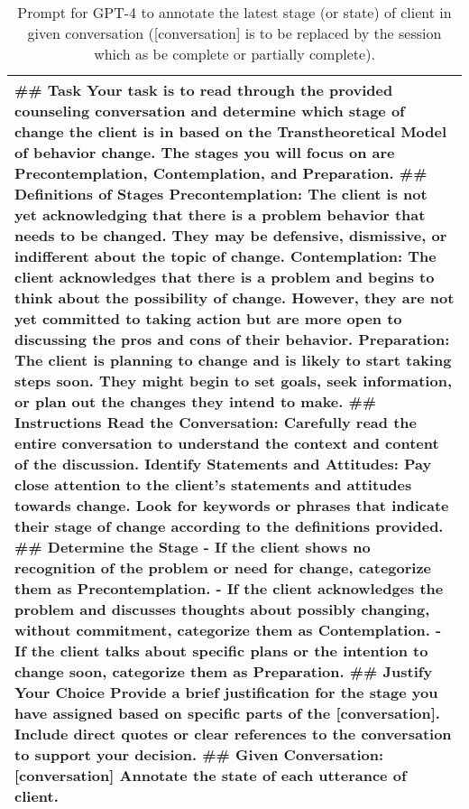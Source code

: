 \begin{table*}[tb]
\begin{tabularx}{\textwidth}{X}
\toprule
\#\# Task
Your task is to read through the provided counseling conversation and determine which stage of change the client is in based on the Transtheoretical Model of behavior change. The stages you will focus on are Precontemplation, Contemplation, and Preparation. \newline \#\# Definitions of Stages \newline Precontemplation: The client is not yet acknowledging that there is a problem behavior that needs to be changed. They may be defensive, dismissive, or indifferent about the topic of change. \newline Contemplation: The client acknowledges that there is a problem and begins to think about the possibility of change. However, they are not yet committed to taking action but are more open to discussing the pros and cons of their behavior. \newline Preparation: The client is planning to change and is likely to start taking steps soon. They might begin to set goals, seek information, or plan out the changes they intend to make.  \newline \#\# Instructions \newline Read the Conversation: Carefully read the entire conversation to understand the context and content of the discussion.
\newline Identify Statements and Attitudes: Pay close attention to the client’s statements and attitudes towards change. Look for keywords or phrases that indicate their stage of change according to the definitions provided. \newline \#\# Determine the Stage \newline - If the client shows no recognition of the problem or need for change, categorize them as Precontemplation.  \newline - If the client acknowledges the problem and discusses thoughts about possibly changing, without commitment, categorize them as Contemplation. \newline - If the client talks about specific plans or the intention to change soon, categorize them as Preparation. \newline \#\# Justify Your Choice  \newline Provide a brief justification for the stage you have assigned based on specific parts of the [conversation]. Include direct quotes or clear references to the conversation to support your decision.  \newline \#\# Given Conversation: [conversation]  \newline Annotate the state of each utterance of client.
\\ \bottomrule
\end{tabularx}
\caption{Prompt for GPT-4 to annotate the latest stage (or state) of client in given conversation ([conversation] is to be replaced by the session which as be complete or partially complete).}
\label{tab:state annotation}
\end{table*}

